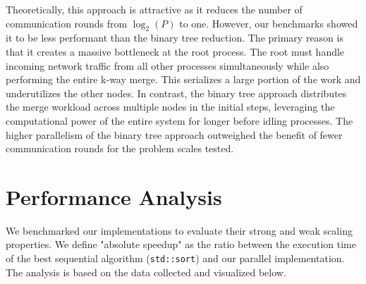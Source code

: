 \documentclass[10pt]{article}
\newcommand{\code}[1]{\texttt{#1}}
\begin{document}
Theoretically, this approach is attractive as it reduces the number of communication rounds from $\log_2(P)$ to one. However, our benchmarks showed it to be less performant than the binary tree reduction. The primary reason is that it creates a massive bottleneck at the root process. The root must handle incoming network traffic from all other processes simultaneously while also performing the entire k-way merge. This serializes a large portion of the work and underutilizes the other nodes. In contrast, the binary tree approach distributes the merge workload across multiple nodes in the initial steps, leveraging the computational power of the entire system for longer before idling processes. The higher parallelism of the binary tree approach outweighed the benefit of fewer communication rounds for the problem scales tested.

\section{Performance Analysis}
We benchmarked our implementations to evaluate their strong and weak scaling properties. We define "absolute speedup" as the ratio between the execution time of the best sequential algorithm (\code{std::sort}) and our parallel implementation. The analysis is based on the data collected and visualized below.
\end{document}
